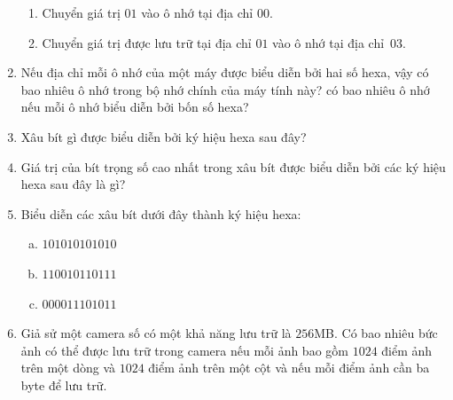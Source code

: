 \begin{multicols}{2}
\begin{enumerate}
\begin{enumerate}[B1. ]
    \item Chuyển giá trị $01$ vào ô nhớ tại địa chỉ $00$.

    \item Chuyển giá trị được lưu trữ tại địa chỉ $01$ vào ô nhớ tại địa chỉ~$03$.
    \end{enumerate}

  \item Nếu địa chỉ mỗi ô nhớ của một máy được biểu diễn bởi hai số hexa, vậy có bao nhiêu
    ô nhớ trong bộ nhớ chính của máy tính này?  có bao nhiêu ô nhớ nếu mỗi ô nhớ biểu diễn
    bởi bốn số hexa?

  \item Xâu bít gì được biểu diễn bởi ký hiệu hexa sau đây?


  \item Giá trị của bít trọng số cao nhất trong xâu bít được biểu diễn bởi các ký hiệu
    hexa sau đây là gì?


  \item Biểu diễn các xâu bít dưới đây thành ký hiệu hexa:
    \begin{enumerate}[a.]
    \item $101010101010$
    \item $110010110111$
    \item $000011101011$
    \end{enumerate}

  \item Giả sử một camera số có một khả năng lưu trữ là $256$MB. Có bao nhiêu bức ảnh có
    thể được lưu trữ trong camera nếu mỗi ảnh bao gồm $1024$ điểm ảnh trên một dòng và
    $1024$ điểm ảnh trên một cột và nếu mỗi điểm ảnh cần ba byte để lưu trữ.


\end{enumerate}
\end{multicols}
